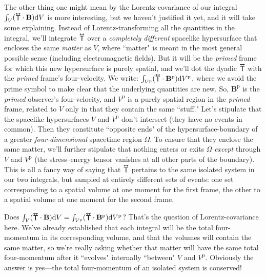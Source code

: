 \documentclass[12pt]{article}
\renewcommand{\vv}[1]{\mathbf{#1}}
\newcommand{\dd}[1]{\mathrm{d}#1}
\newcommand{\tightoverset}[2]{%
  \mathop{#2}\limits^{\vbox to -.5ex{\kern-0.75ex\hbox{$#1$}\vss}}}
\newcommand{\inlinedy}[1]{\tightoverset{\text{\tiny$\bm\leftrightarrow$}}{#1}}
\begin{document}
The other thing one might mean by the Lorentz-covariance of our integral ${\int_V ({\inlinedy{\mathsf{T}}} \cdot \vv B) \dd V}$ is more interesting, but we haven't justified it yet, and it will take some explaining. Instead of Lorentz-transforming all the quantities in the integral, we'll integrate ${\inlinedy{\mathsf{T}}}$ over a \emph{completely different} spacelike hypersurface that encloses the same \emph{matter} as $V$, where ``matter" is meant in the most general possible sense (including electromagnetic fields). But it will be the \emph{primed} frame for which this new hypersurface is purely spatial, and we'll dot the dyadic ${\inlinedy{\mathsf{T}}}$ with the \emph{primed} frame's four-velocity. We write: $\int_{V^\textrm{p}} ({\inlinedy{\mathsf{T}}} \cdot \vv B^{\textrm{p}}) \dd V^\textrm{p}$, where we avoid the prime symbol to make clear that the underlying quantities are new. So, $\vv B^{\textrm{p}}$ is the \emph{primed} observer's four-velocity, and $V^\textrm{p}$ is a purely spatial region in the \emph{primed} frame, related to $V$ only in that they contain the same ``stuff." Let's stipulate that the spacelike hypersurfaces $V$ and $V^\textrm{p}$ don't intersect (they have no events in common). Then they constitute ``opposite ends" of the hypersurface-boundary of a greater \emph{four-dimensional} spacetime region $\Omega$. To ensure that they enclose the same matter, we'll further stipulate that nothing enters or exits $\Omega$ \emph{except} through $V$ and $V^\textrm{p}$ (the stress--energy tensor vanishes at all other parts of the boundary). This is all a fancy way of saying that ${\inlinedy{\mathsf{T}}}$ pertains to the same isolated system in our two integrals, but sampled at entirely different sets of events: one set corresponding to a spatial volume at one moment for the first frame, the other to a spatial volume at one moment for the second frame.

Does ${\int_V ({\inlinedy{\mathsf{T}}} \cdot \vv B) \dd V} = \int_{V^\textrm{p}} ({\inlinedy{\mathsf{T}}} \cdot \vv B^{\textrm{p}} ) \dd V^\textrm{p}$? That's the question of Lorentz-covariance here. We've already established that each integral will be the total four-momentum in its corresponding volume, and that the volumes will contain the same matter, so we're really asking whether that matter will have the same total four-momentum after it ``evolves" internally ``between" $V$ and $V^{\textrm{p}}$. Obviously the answer is yes---the total four-momentum of an isolated system is conserved!
\end{document}
